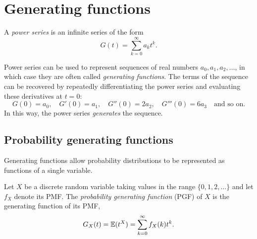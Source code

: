 
\section{Generating functions}\label{sec:gen_funs}

%
%
%
%
A \emph{power series} is an infinite series of the form
\[
G(t) = \sum_{k=0}^{\infty} a_k t^k.
\]

Power series can be used to represent sequences of real numbers $a_0,a_1,a_2,\ldots$, in which case they are often called \emph{generating functions}. The terms of the sequence can be recovered by repeatedly differentiating the power series and evaluating these derivatives at $t=0$:
\[
G(0) = a_0,\quad G'(0) = a_1,\quad G''(0) = 2a_2,\quad G'''(0) = 6a_3\quad\text{and so on.}
\]
In this way, the power series \emph{generates} the sequence.


\subsection{Probability generating functions}

Generating functions allow probability distributions to be represented as functions of a single variable. 

\begin{definition}
Let $X$ be a discrete random variable taking values in the range $\{0,1,2,\ldots\}$ and let $f_X$ denote its PMF. The \emph{probability generating function} (PGF) of $X$ is the generating function of its PMF,
\[
G_X(t) = \mathbb{E}(t^X) = \sum_{k=0}^{\infty} f_X(k) t^k.
\]
\end{definition}

